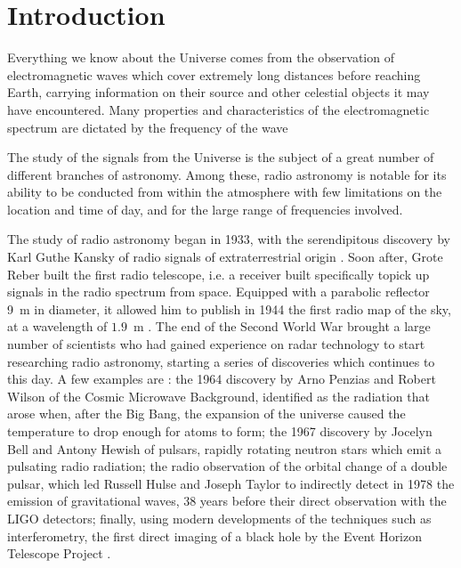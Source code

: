 \section{Introduction}
Everything we know about the Universe comes from the observation of electromagnetic waves which cover extremely long distances before {reaching Earth}, carrying information on their source and other celestial objects it may have encountered.
{Many properties and characteristics of the electromagnetic spectrum are dictated by the frequency of the wave}

The study of the signals from the Universe is the subject of a great number of different branches of astronomy. Among these, radio astronomy is notable {for its ability to be conducted} from within the atmosphere with few limitations on the location and time of day, and for the large range of frequencies involved.

The study of radio astronomy began in 1933, with the serendipitous discovery by Karl Guthe Kansky of radio signals of extraterrestrial origin \cite{condon_essential_2016}. 
Soon after, Grote Reber built the first radio telescope, i.e. a {receiver} built specifically to{pick up} signals in the radio spectrum from space. Equipped with a parabolic reflector \mbox{9 m} in diameter, it allowed him to publish in 1944 the first radio map of the sky, at a wavelength of \mbox{$1.9$ m} \cite{lauterbach_radio_2022}.
The end of the Second World War brought a large number of scientists who had gained experience on radar technology to start researching radio astronomy, starting a series of discoveries which continues to this day.
A few examples are \cite{lauterbach_radio_2022}: 
the 1964 discovery by Arno Penzias and Robert Wilson of the Cosmic Microwave Background, identified as the radiation that arose when, after the Big Bang, the expansion of the universe caused the temperature to drop enough for atoms to form;
the 1967 discovery by Jocelyn Bell and Antony Hewish of pulsars, rapidly rotating neutron stars which emit a pulsating radio radiation; 
the radio observation of the orbital change of a double pulsar, which led Russell Hulse and Joseph Taylor to indirectly detect in 1978 the emission of gravitational waves, 38 years before their direct observation with the LIGO detectors;
finally, using modern developments of the techniques such as interferometry, the first direct imaging of a black hole by the Event Horizon Telescope Project \cite{the_event_horizon_telescope_collaboration_first_2019}. 

